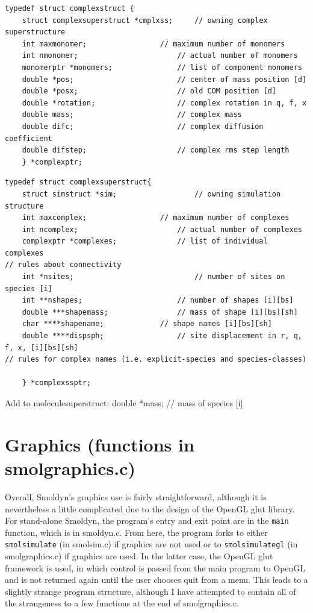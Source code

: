 \documentclass {scrbook}
\newcommand {\ttt} {\texttt}
\begin{document}
\begin{lstlisting}
typedef struct complexstruct {
	struct complexsuperstruct *cmplxss;		// owning complex superstructure
	int maxmonomer;					// maximum number of monomers
	int nmonomer;						// actual number of monomers
	monomerptr *monomers;				// list of component monomers
	double *pos;						// center of mass position [d]
	double *posx;						// old COM position [d]
	double *rotation;					// complex rotation in q, f, x
	double mass;						// complex mass
	double difc;						// complex diffusion coefficient
	double difstep;						// complex rms step length
	} *complexptr;
\end{lstlisting}


\begin{lstlisting}
typedef struct complexsuperstruct{
	struct simstruct *sim;					// owning simulation structure
	int maxcomplex;					// maximum number of complexes
	int ncomplex;						// actual number of complexes
	complexptr *complexes;				// list of individual complexes
// rules about connectivity
	int *nsites;							// number of sites on species [i]
	int **nshapes;						// number of shapes [i][bs]
	double ***shapemass;				// mass of shape [i][bs][sh]
	char ****shapename;				// shape names [i][bs][sh]
	double ****dispsph;					// site displacement in r, q, f, x, [i][bs][sh]
// rules for complex names (i.e. explicit-species and species-classes)
	
	} *complexssptr;
\end{lstlisting}


Add to moleculesuperstruct:
	double *mass;						// mass of species [i]


\section{Graphics (functions in smolgraphics.c)}

Overall, Smoldyn's graphics use is fairly straightforward, although it is nevertheless a little complicated due to the design of the OpenGL glut library. For stand-alone Smoldyn, the program's entry and exit point are in the \ttt{main} function, which is in smoldyn.c. From here, the program forks to either \ttt{smolsimulate} (in smolsim.c) if graphics are not used or to \ttt{smolsimulategl} (in smolgraphics.c) if graphics are used. In the latter case, the OpenGL glut framework is used, in which control is passed from the main program to OpenGL and is not returned again until the user chooses quit from a menu. This leads to a slightly strange program structure, although I have attempted to contain all of the strangeness to a few functions at the end of smolgraphics.c.
\end{document}
